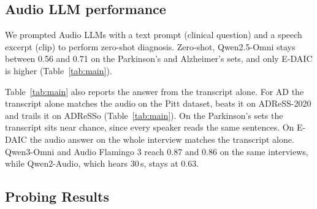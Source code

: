 \documentclass{article}
\begin{document}
\subsection{Audio LLM performance}
We prompted Audio LLMs with a text prompt (clinical question) and a speech excerpt (clip) to perform zero-shot diagnosis. Zero-shot, Qwen2.5-Omni stays between 0.56 and 0.71 on the Parkinson's and Alzheimer's sets, and only E-DAIC is higher (Table~\ref{tab:main}). 

Table~\ref{tab:main} also reports the answer from the transcript alone. For AD the transcript alone matches the audio on the Pitt dataset, beats it on ADReSS-2020 and trails it on ADReSSo (Table~\ref{tab:main}). On the Parkinson's sets the transcript sits near chance, since every speaker reads the same sentences. On E-DAIC the audio answer on the whole interview matches the transcript alone. Qwen3-Omni and Audio Flamingo 3 reach 0.87 and 0.86 on the same interviews, while Qwen2-Audio, which hears 30\,s, stays at 0.63.



\subsection{Probing Results}\label{sec:gap}
\end{document}
